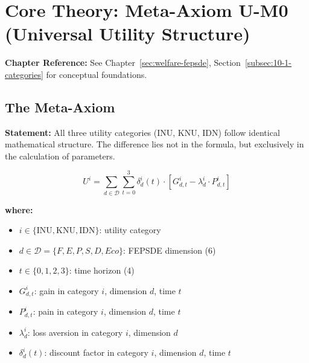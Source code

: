 \section{Core Theory: Meta-Axiom U-M0 (Universal Utility Structure)}
\label{sec:app-c-meta-axiom}

\begin{cross-reference}
\textbf{Chapter Reference:} See Chapter~\ref{sec:welfare-fepsde}, 
Section~\ref{subsec:10-1-categories} for conceptual foundations.
\end{cross-reference}

\subsection{The Meta-Axiom}

\begin{tcolorbox}[colback=red!5!white, colframe=red!75!black, 
    title=\textbf{META-AXIOM U-M0: Universal Utility Structure}]

\textbf{Statement:} All three utility categories (INU, KNU, IDN) follow identical 
mathematical structure. The difference lies not in the formula, but exclusively 
in the calculation of parameters.

\begin{equation}
\boxed{
U^{i} = \sum_{d \in \mathcal{D}} \sum_{t=0}^{3} \delta^{i}_{d}(t) \cdot 
\left[ G^{i}_{d,t} - \lambda^{i}_{d} \cdot P^{i}_{d,t} \right]
}
\label{eq:meta-axiom}
\end{equation}

\textbf{where:}
\begin{itemize}
\item $i \in \{\text{INU}, \text{KNU}, \text{IDN}\}$: utility category
\item $d \in \mathcal{D} = \{F, E, P, S, D, Eco\}$: FEPSDE dimension (6)
\item $t \in \{0, 1, 2, 3\}$: time horizon (4)
\item $G^{i}_{d,t}$: gain in category $i$, dimension $d$, time $t$
\item $P^{i}_{d,t}$: pain in category $i$, dimension $d$, time $t$
\item $\lambda^{i}_{d}$: loss aversion in category $i$, dimension $d$
\item $\delta^{i}_{d}(t)$: discount factor in category $i$, dimension $d$, time $t$
\end{itemize}

\end{tcolorbox}

